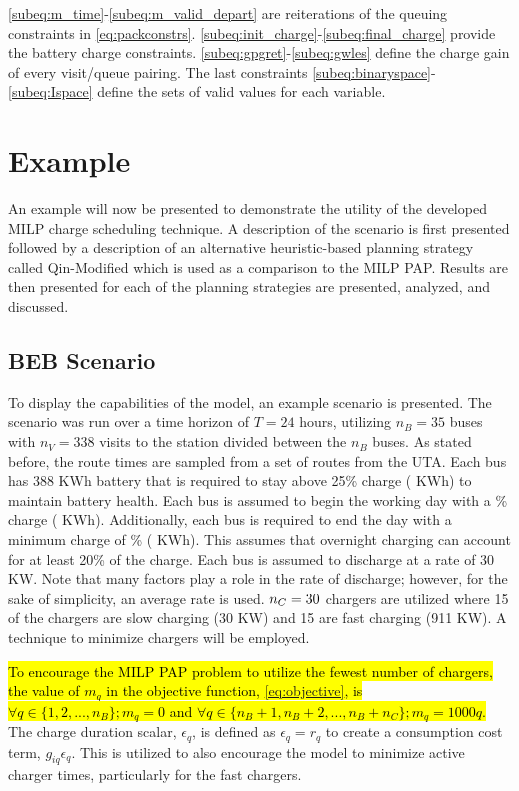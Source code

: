 \documentclass[utf8]{FrontiersinHarvard}
\newcommand{\A}{35 }                                                            %
\newcommand{\N}{338 }                                                           %
\newcommand{\acharge}{0.9}                                                      %
\newcommand{\bcharge}{0.7 }                                                     %
\newcommand{\mincharge}{25\% }                                                  %
\newcommand{\minchargeD}{0.25 }                                                 %
\newcommand{\batsize}{388 }                                                     %
\newcommand{\fast}{15 }                                                         %
\newcommand{\slow}{15 }                                                         %
\newcommand{\fasts}{911 }                                                       %
\newcommand{\slows}{30 }                                                        %
\begin{document}
\autoref{subeq:m_time}-\autoref{subeq:m_valid_depart} are reiterations of the queuing constraints in
\autoref{eq:packconstrs}. \autoref{subeq:init_charge}-\autoref{subeq:final_charge} provide the battery charge
constraints. \autoref{subeq:gpgret}-\autoref{subeq:gwles} define the charge gain of every visit/queue
pairing. The last constraints \autoref{subeq:binaryspace}-\autoref{subeq:Ispace} define the sets of valid values for each
variable.
\section{Example}
\label{sec:example}
An example will now be presented to demonstrate the utility of the developed MILP charge scheduling technique. A
description of the scenario is first presented followed by a description of an alternative heuristic-based planning
strategy called Qin-Modified which is used as a comparison to the MILP PAP. Results are then presented for each of the
planning strategies are presented, analyzed, and discussed.

\subsection{BEB Scenario}
\label{beb-scenario}
To display the capabilities of the model, an example scenario is presented. The scenario was run over a time horizon of
\(T=24\) hours, utilizing \(n_B = \A\) buses with \(n_V = \N\) visits to the station divided between the \(n_B\) buses. As
stated before, the route times are sampled from a set of routes from the UTA. Each bus has \batsize KWh battery that is
required to stay above \mincharge charge (\fpeval{\batsize * \minchargeD} KWh) to maintain battery health. Each bus is
assumed to begin the working day with a \fpeval{\acharge*100}\% charge (\fpeval{\acharge * \batsize} KWh). Additionally,
each bus is required to end the day with a minimum charge of \fpeval{\bcharge * 100}\% (\fpeval{\bcharge * \batsize}
KWh). This assumes that overnight charging can account for at least 20\% of the charge. Each bus is assumed to discharge
at a rate of 30 KW. Note that many factors play a role in the rate of discharge; however, for the sake of simplicity, an
average rate is used. \(n_C = \fpeval{\fast + \slow}\) chargers are utilized where \slow of the chargers are slow charging
(\slows KW) and \fast are fast charging (\fasts KW). A technique to minimize chargers will be employed.

\hl{To encourage the MILP PAP problem to utilize the fewest number of chargers, the value of $m_q$ in the objective function, {\autoref{eq:objective}}, is $\forall q \in \{1,2,..., n_B \}; m_q = 0$ and $\forall q \in \{n_B + 1, n_B + 2,..., n_B + n_C \}; m_q = 1000q$.} The charge duration scalar, \(\epsilon_q\), is defined as \(\epsilon_q = r_q\) to create a consumption cost
term, \(g_{iq}\epsilon_q\). This is utilized to also encourage the model to minimize active charger times, particularly for the
fast chargers.
\end{document}
